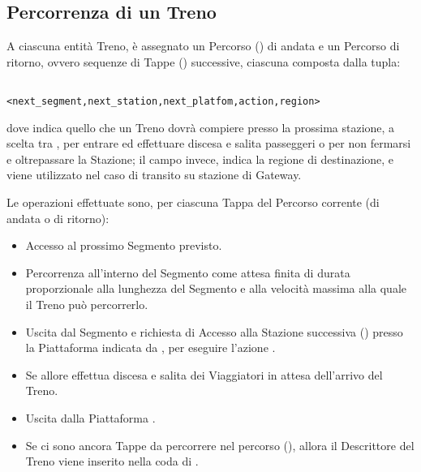 	\subsection{Percorrenza di un Treno}
	
	A ciascuna entità Treno, è assegnato un Percorso () di andata e un Percorso di ritorno, ovvero sequenze di Tappe () successive, ciascuna composta dalla tupla:
				\begin{center}
					\begin{verbatim}
						       <next_segment,next_station,next_platfom,action,region>
					\end{verbatim}
				\end{center}
dove  indica quello che un Treno dovrà compiere presso la prossima stazione, a scelta tra , per entrare ed effettuare discesa e salita passeggeri o  per non fermarsi e oltrepassare la Stazione; il campo  invece, indica la regione di destinazione, e viene utilizzato nel caso di transito su stazione di Gateway.

Le operazioni effettuate sono, per ciascuna Tappa del Percorso corrente (di andata o di ritorno):
				\begin{itemize} 
					\item Accesso al prossimo Segmento  previsto.
					\item Percorrenza all'interno del Segmento come attesa finita di durata proporzionale alla lunghezza del Segmento e alla velocità massima alla quale il Treno può percorrerlo.
					\item Uscita dal Segmento e richiesta di Accesso alla Stazione successiva () presso la Piattaforma indicata da , per eseguire l'azione .
					\item Se  allore effettua discesa e salita dei Viaggiatori in attesa dell'arrivo del Treno.
					\item Uscita dalla Piattaforma .
					\item Se ci sono ancora Tappe da percorrere nel percorso (), allora il Descrittore del Treno viene inserito nella coda di . 
				\end{itemize}

	
